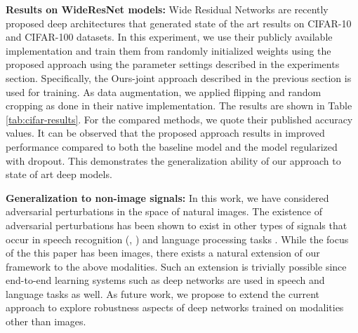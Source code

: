 \documentclass[letterpaper]{article} %
\begin{document}
\textbf{Results on WideResNet models:} Wide Residual Networks are recently proposed deep architectures that generated state of the art results on CIFAR-10 and CIFAR-100 datasets. In this experiment, we use their publicly available implementation and train them from randomly initialized weights using the proposed approach using the parameter settings described in the experiments section. Specifically, the Ours-joint approach described in the previous section is used for training. As data augmentation, we applied flipping and random cropping as done in their native implementation. The results are shown in Table \ref{tab:cifar-results}. For the compared methods, we quote their published accuracy values. It can be observed that the proposed approach results in improved performance compared to both the baseline model and the model regularized with dropout. This demonstrates the generalization ability of our approach to state of art deep models.
\begin{center}
\label{tab:cifar-results}
\end{center}

\textbf{Generalization to non-image signals:}
In this work, we have considered adversarial perturbations in the space of natural images. The existence of adversarial perturbations has been shown to exist in other types of signals that occur in speech recognition (\cite{serdyuk2016invariant}, \cite{carlini_speech}) and language processing tasks \cite{miyato_NLP}. While the focus of the this paper has been images, there exists a natural extension of our framework to the above modalities. Such an extension is trivially possible since end-to-end learning systems such as deep networks are used in speech and language tasks as well. As future work, we propose to extend the current approach to explore robustness aspects of deep networks trained on modalities other than images.
\end{document}

